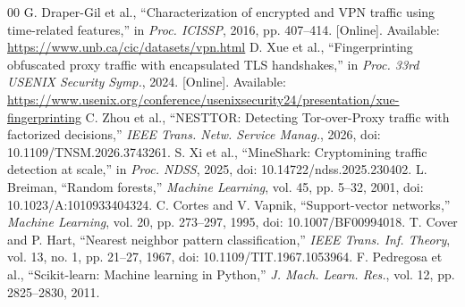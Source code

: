 \documentclass[conference]{IEEEtran}
\begin{document}
\begin{thebibliography}{00}
 G. Draper-Gil et al., ``Characterization of encrypted and VPN traffic using time-related features,'' in \emph{Proc. ICISSP}, 2016, pp. 407--414. [Online]. Available: \url{https://www.unb.ca/cic/datasets/vpn.html}
 D. Xue et al., ``Fingerprinting obfuscated proxy traffic with encapsulated TLS handshakes,'' in \emph{Proc. 33rd USENIX Security Symp.}, 2024. [Online]. Available: \url{https://www.usenix.org/conference/usenixsecurity24/presentation/xue-fingerprinting}
 C. Zhou et al., ``NESTTOR: Detecting Tor-over-Proxy traffic with factorized decisions,'' \emph{IEEE Trans. Netw. Service Manag.}, 2026, doi: 10.1109/TNSM.2026.3743261.
 S. Xi et al., ``MineShark: Cryptomining traffic detection at scale,'' in \emph{Proc. NDSS}, 2025, doi: 10.14722/ndss.2025.230402.
 L. Breiman, ``Random forests,'' \emph{Machine Learning}, vol. 45, pp. 5--32, 2001, doi: 10.1023/A:1010933404324.
 C. Cortes and V. Vapnik, ``Support-vector networks,'' \emph{Machine Learning}, vol. 20, pp. 273--297, 1995, doi: 10.1007/BF00994018.
 T. Cover and P. Hart, ``Nearest neighbor pattern classification,'' \emph{IEEE Trans. Inf. Theory}, vol. 13, no. 1, pp. 21--27, 1967, doi: 10.1109/TIT.1967.1053964.
 F. Pedregosa et al., ``Scikit-learn: Machine learning in Python,'' \emph{J. Mach. Learn. Res.}, vol. 12, pp. 2825--2830, 2011.
\end{thebibliography}
\end{document}
